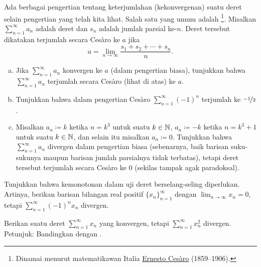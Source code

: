 \begin{exnote}
Ada berbagai pengertian tentang keterjumlahan (kekonvergenan)
suatu deret
selain pengertian yang telah kita lihat.
Salah satu yang umum adalah \emph{}%
\footnote{Dinamai menurut matematikawan Italia
\href{https://en.wikipedia.org/wiki/Ernesto_Ces\%C3\%A0ro}{Ernesto Ces\`aro}
(1859--1906).}.  Misalkan $\sum_{n=1}^\infty a_n$ adalah deret
dan $s_n$ adalah jumlah parsial ke-$n$.  Deret tersebut dikatakan
terjumlah secara Ces\`aro ke $a$ jika
\begin{equation*}
a = \lim_{n\to \infty} \frac{s_1 + s_2 + \cdots + s_n}{n} .
\end{equation*}
\end{exnote}

\begin{exercise}[Menantang]
\pagebreak[2]
\leavevmode
\begin{enumerate}[a)]
\item
Jika $\sum_{n=1}^\infty a_n$ konvergen ke $a$ (dalam pengertian biasa), tunjukkan bahwa
$\sum_{n=1}^\infty a_n$ terjumlah secara Ces\`aro (lihat di atas) ke $a$.
\item
Tunjukkan bahwa dalam pengertian Ces\`aro $\sum_{n=1}^\infty {(-1)}^n$ terjumlah ke
$\nicefrac{-1}{2}$.
\item
Misalkan $a_n \coloneqq k$ ketika $n = k^3$ untuk suatu $k \in {\mathbb{N}}$,
$a_n \coloneqq -k$ ketika $n = k^3+1$ untuk suatu $k \in {\mathbb{N}}$,
dan selain itu
misalkan $a_n \coloneqq 0$.  Tunjukkan bahwa $\sum_{n=1}^\infty a_n$ divergen dalam pengertian biasa
(sebenarnya, baik barisan suku-sukunya maupun barisan jumlah parsialnya tidak terbatas), tetapi deret tersebut
terjumlah secara Ces\`aro ke 0 (sekilas tampak agak paradoksal).
\end{enumerate}
\end{exercise}

\begin{exercise}[Menantang]
Tunjukkan bahwa kemonotonan dalam uji deret berselang-seling
diperlukan.  Artinya, berikan barisan bilangan real positif
$\{ x_n \}_{n=1}^\infty$ dengan $\lim_{n\to\infty} x_n = 0$, tetapi
$\sum_{n=1}^\infty {(-1)}^n x_n$ divergen.
\end{exercise}

\begin{exercise}
Berikan suatu deret
$\sum_{n=1}^\infty x_n$ yang konvergen,
tetapi $\sum_{n=1}^\infty x_n^2$ divergen.
Petunjuk: Bandingkan dengan .
\end{exercise}

